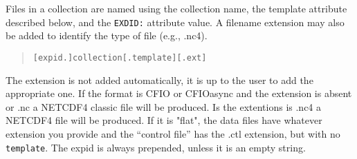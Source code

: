 Files in a collection are named using the collection name, the
template attribute described below, and the {\tt EXDID:} attribute
value. A filename extension may also be added to identify the type of
file (e.g., .nc4).
\begin{quote}
    {\tt [expid.]collection[.template][.ext]}
\end{quote}
The extension is not added automatically, it is up to the user to add the appropriate one.
If the format is CFIO or CFIOasync and the extension is absent or .nc a NETCDF4 classic file
will be produced. Is the extentions is .nc4 a NETCDF4 file will be produced.
If it is "flat", the data files have whatever extension you provide and
the ``control file'' has the .ctl extension, but with no {\tt
template}. The expid is always prepended, unless it is an empty
string.

